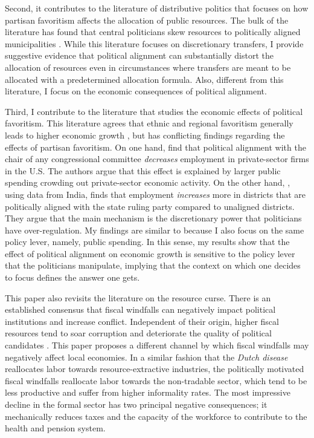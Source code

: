 \documentclass[dv_diss_main.tex]{subfiles}
\begin{document}
Second, it contributes to the literature of distributive politics that focuses on how partisan favoritism affects the allocation of public resources. The bulk of the literature has found that central politicians skew resources to politically aligned municipalities \citep{brollo2012tying,curto2018does,bracco2015intergovernmental,fiva2016local, albouy2013partisan}. While this literature focuses on discretionary transfers, I provide suggestive evidence that political alignment can substantially distort the allocation of resources even in circumstances where transfers are meant to be allocated with a predetermined allocation formula. Also, different from this literature, I focus on the economic consequences of political alignment. 

Third, I contribute to the literature that studies the economic effects of political favoritism. 
This literature agrees that ethnic and regional favoritism generally leads to higher economic growth \citep{hodler2014regional,alesina2016ethnic}, but has conflicting findings regarding the effects of partisan favoritism. 
On one hand, \cite{cohen2011powerful} find that political alignment with the chair of any congressional committee  \textit{decreases} employment in private-sector firms in the U.S. The authors argue that this effect is explained by larger public spending crowding out private-sector economic activity. On the other hand, \cite{asher2017politics}, using data from India, finds that employment \textit{increases} more in districts that are politically aligned with the state ruling party compared to unaligned districts. They argue that the main mechanism is the discretionary power that politicians have over-regulation. 
My findings are similar to \cite{cohen2011powerful} because I also focus on the same policy lever, namely, public spending. In this sense, my results show that the effect of political alignment on economic growth is sensitive to the policy lever that the politicians manipulate, implying that the context on which one decides to focus defines the answer one gets.  

This paper also revisits the literature on the resource curse. 
There is an established consensus that fiscal windfalls can negatively impact political institutions and increase conflict. Independent of their origin, higher fiscal resources tend to soar corruption and deteriorate the quality of political candidates \citep{brollo2013political,asher2018rent,chen2016land,vogel2021effect}.
This paper proposes a different channel by which fiscal windfalls may negatively affect local economies.  In a similar fashion that the \textit{Dutch disease} reallocates labor towards resource-extractive industries, the politically motivated fiscal windfalls reallocate labor towards the non-tradable sector, which tend to be less productive and suffer from higher informality rates. 
The most impressive decline in the formal sector has two principal negative consequences; it mechanically reduces taxes and the capacity of the workforce to contribute to the health and pension system. 
\end{document}
